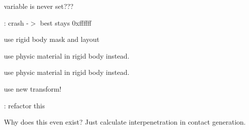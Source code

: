 
\begin{DoxyRefList}
\item[\label{todo__todo000012}%
\Hypertarget{todo__todo000012}%
Member \mbox{\hyperlink{classr3_1_1_box_box_narrow_algorithm_a200098ad4e6e2381f58856002a2d5dec}{r3\+:\+:Box\+Box\+Narrow\+Algorithm\+:\+:generate\+Contact\+Data\+Impl}} (\mbox{\hyperlink{classr3_1_1_rigid_body}{Rigid\+Body}} $\ast$rb\+Box1, \mbox{\hyperlink{classr3_1_1_collision_box}{Collision\+Box}} $\ast$box1, \mbox{\hyperlink{classr3_1_1_rigid_body}{Rigid\+Body}} $\ast$rb\+Box2, \mbox{\hyperlink{classr3_1_1_collision_box}{Collision\+Box}} $\ast$box2, \mbox{\hyperlink{classr3_1_1_collision_data}{Collision\+Data}} \&collision\+Data) override]variable is never set??? 

\+: crash -\/$>$ best stays 0xffffff  
\item[\label{todo__todo000017}%
\Hypertarget{todo__todo000017}%
Member \mbox{\hyperlink{classr3_1_1_broad_phase_filter_a0435dc6468401e32bf151f84f52e80f8}{r3\+:\+:Broad\+Phase\+Filter\+:\+:generate\+Collisions}} (const std\+::vector$<$ Rigid\+Body $\ast$$>$ \&rigid\+Bodies, Fixed\+Size\+Container$<$ Collision\+Pair $>$ \&data) override]use rigid body mask and layout  
\item[\label{todo__todo000009}%
\Hypertarget{todo__todo000009}%
Member \mbox{\hyperlink{classr3_1_1_collision_data_ae610a57c20c504a7bacb4e35f89f530f}{r3\+:\+:Collision\+Data\+:\+:get\+Friction}} () const]use physic material in rigid body instead.  
\item[\label{todo__todo000010}%
\Hypertarget{todo__todo000010}%
Member \mbox{\hyperlink{classr3_1_1_collision_data_a4fa1a70757353fe8ae2facc3762f5b2b}{r3\+:\+:Collision\+Data\+:\+:get\+Restitution}} () const]use physic material in rigid body instead.  
\item[\label{todo__todo000018}%
\Hypertarget{todo__todo000018}%
Member \mbox{\hyperlink{classr3_1_1_collision_primitive_ae27cb70a6812491c2d8de97f22c07ac6}{r3\+:\+:Collision\+Primitive\+:\+:calculate\+Internals}} ()]use new transform!  
\item[\label{todo__todo000001}%
\Hypertarget{todo__todo000001}%
Member \mbox{\hyperlink{classr3_1_1_particle_buoyancy_a15857a4724e0e91efd9ce45831d00cbd}{r3\+:\+:Particle\+Buoyancy\+:\+:s\+\_\+gravity}} ]\+: refactor this  
\item[\label{todo__todo000002}%
\Hypertarget{todo__todo000002}%
Member \mbox{\hyperlink{classr3_1_1_particle_collision_af3c52ed10e7495207bf20f3263175098}{r3\+:\+:Particle\+Collision\+:\+:Particle\+Collision}} (real restitution, real distance, real penetration)]Why does this even exist? Just calculate interpenetration in contact generation.  
$$
\end{DoxyRefList}

